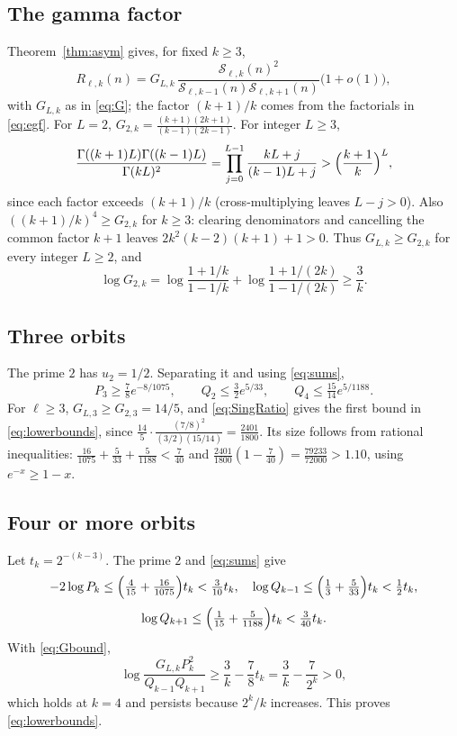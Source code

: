 \documentclass[11pt,a4paper]{article}
\theoremstyle{remark}
\numberwithin{equation}{section}
\newcommand{\Sing}{\mathcal S}
\begin{document}
\subsection{The gamma factor}
Theorem~\ref{thm:asym} gives, for fixed $k\ge3$,
\[
R_{\ell,k}(n)=G_{L,k}\,\frac{\Sing_{\ell,k}(n)^2}{\Sing_{\ell,k-1}(n)\Sing_{\ell,k+1}(n)}\bigl(1+o(1)\bigr),
\]
with $G_{L,k}$ as in \eqref{eq:G}; the factor $(k+1)/k$ comes from the factorials in \eqref{eq:egf}. For $L=2$, $G_{2,k}=\frac{(k+1)(2k+1)}{(k-1)(2k-1)}$. For integer $L\ge3$,
\[
\frac{\Gamma((k+1)L)\Gamma((k-1)L)}{\Gamma(kL)^2}=\prod_{j=0}^{L-1}\frac{kL+j}{(k-1)L+j}>\Bigl(\frac{k+1}{k}\Bigr)^L,
\]
since each factor exceeds $(k+1)/k$ (cross-multiplying leaves $L-j>0$). Also $((k+1)/k)^4\ge G_{2,k}$ for $k\ge3$: clearing denominators and cancelling the common factor $k+1$ leaves $2k^2(k-2)(k+1)+1>0$. Thus $G_{L,k}\ge G_{2,k}$ for every integer $L\ge2$, and
\begin{equation}\label{eq:Gbound}
\log G_{2,k}=\log\frac{1+1/k}{1-1/k}+\log\frac{1+1/(2k)}{1-1/(2k)}\ge\frac3k .
\end{equation}

\subsection{Three orbits}
The prime $2$ has $u_2=1/2$. Separating it and using \eqref{eq:sums},
\[
P_3\ge\tfrac78e^{-8/1075},\qquad Q_2\le\tfrac32e^{5/33},\qquad Q_4\le\tfrac{15}{14}e^{5/1188}.
\]
For $\ell\ge3$, $G_{L,3}\ge G_{2,3}=14/5$, and \eqref{eq:SingRatio} gives the first bound in \eqref{eq:lowerbounds}, since $\frac{14}5\cdot\frac{(7/8)^2}{(3/2)(15/14)}=\frac{2401}{1800}$. Its size follows from rational inequalities: $\frac{16}{1075}+\frac5{33}+\frac5{1188}<\frac7{40}$ and $\frac{2401}{1800}(1-\frac7{40})=\frac{79233}{72000}>1.10$, using $e^{-x}\ge1-x$.

\subsection{Four or more orbits}
Let $t_k=2^{-(k-3)}$. The prime $2$ and \eqref{eq:sums} give
\[
-2\log P_k\le\Bigl(\tfrac4{15}+\tfrac{16}{1075}\Bigr)t_k<\tfrac3{10}t_k,\quad
\log Q_{k-1}\le\Bigl(\tfrac13+\tfrac5{33}\Bigr)t_k<\tfrac12t_k,
\]
\[
\log Q_{k+1}\le\Bigl(\tfrac1{15}+\tfrac5{1188}\Bigr)t_k<\tfrac3{40}t_k .
\]
With \eqref{eq:Gbound},
\[
\log\frac{G_{L,k}P_k^2}{Q_{k-1}Q_{k+1}}\ge\frac3k-\frac78t_k=\frac3k-\frac7{2^k}>0 ,
\]
which holds at $k=4$ and persists because $2^k/k$ increases. This proves \eqref{eq:lowerbounds}.
\end{document}
